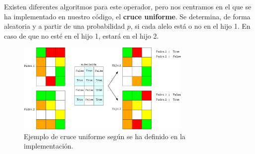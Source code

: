 \documentclass[12pt,a4paper]{book}
\begin{document}
Existen diferentes algoritmos para este operador, pero nos centramos en el que se ha implementado en nuestro código, el \textbf{cruce uniforme}. Se determina, de forma aleatoria y a partir de una probabilidad $p$, si cada alelo está o no en el hijo 1. En caso de que no esté en el hijo 1, estará en el hijo 2.  

		\begin{figure}[h]
    	\begin{center}
    	\includegraphics[width=0.75\textwidth]{img/cruce_ejemplo.png}
    	\end{center}
    	\caption{Ejemplo de cruce uniforme según se ha definido en la implementación.}
    	\label{fig:cruce_uniforme}
	\end{figure} 

%		
%	
%
\end{document}
